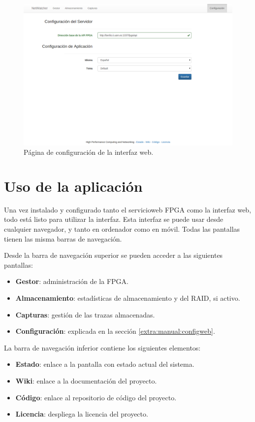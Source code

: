 \begin{figure}[htp!]
  \centering
  \includegraphics[width=\textwidth,clip=true]{graphics/capturas/configuracion_tema_base}
  \caption{Página de configuración de la interfaz web.}
  \label{fig:captura:configuracion}
\end{figure}


\section{Uso de la aplicación\label{extra:manual:uso}}
Una vez instalado y configurado tanto el \gls{servicioweb} \gls{FPGA} como la interfaz web, todo está listo para utilizar la interfaz. Esta interfaz se puede usar desde cualquier navegador, y tanto en ordenador como en móvil. Todas las pantallas tienen las misma barras de navegación.

Desde la barra de navegación superior se pueden acceder a las siguientes pantallas:
\begin{itemize}
  \item \textbf{Gestor}: administración de la \gls{FPGA}.
  \item \textbf{Almacenamiento}: estadísticas de almacenamiento y del \gls{RAID}, si activo.
  \item \textbf{Capturas}: gestión de las \glspl{traza} almacenadas.
  \item \textbf{Configuración}: explicada en la sección \ref{extra:manual:configweb}.
\end{itemize}

La barra de navegación inferior contiene los siguientes elementos:
\begin{itemize}
  \item \textbf{Estado}: enlace a la pantalla con estado actual del sistema.
  \item \textbf{Wiki}: enlace a la documentación del proyecto.
  \item \textbf{Código}: enlace al repositorio de código del proyecto.
  \item \textbf{Licencia}: despliega la licencia del proyecto.
\end{itemize}

